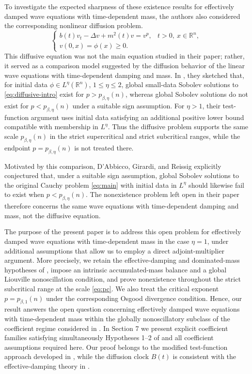 \documentclass[11pt,reqno]{amsart}
\theoremstyle{definition}
\theoremstyle{remark}
\begin{document}
	To investigate the expected sharpness of these existence results for effectively damped wave equations with time-dependent mass, the authors also considered the corresponding nonlinear diffusion problem.
	\begin{equation}
		\label{eq:diffusive-intro}
		\begin{cases}
			b(t)v_t-\Delta v+m^2(t)v=v^p,
			&t>0,\ x\in\mathbb{R}^n,\\
			v(0,x)=\phi(x)\geq0.
		\end{cases}
	\end{equation}
	This diffusive equation was not the main equation studied in their paper; rather, it served as a comparison model suggested by the diffusion behavior of the linear wave equations with time-dependent damping and mass. In \cite[Section 5]{DGR2019}, they sketched that, for initial data $\phi\in L^\eta(\mathbb R^n)$, $1\leq\eta\leq2$, global small-data Sobolev solutions to \eqref{eq:diffusive-intro} exist for $p>p_{\beta,\eta}(n)$, whereas global Sobolev solutions do not exist for $p<p_{\beta,\eta}(n)$ under a suitable sign assumption. For $\eta>1$, their test-function argument uses initial data satisfying an additional positive lower bound compatible with membership in $L^\eta$. Thus the diffusive problem supports the same scale $p_{\beta,\eta}(n)$ in the strict supercritical and strict subcritical ranges, while the endpoint $p=p_{\beta,\eta}(n)$ is not treated there.
	
	Motivated by this comparison, D'Abbicco, Girardi, and Reissig explicitly conjectured that, under a suitable sign assumption, global Sobolev solutions to the original Cauchy problem \eqref{eq:main} with initial data in $L^\eta$ should likewise fail to exist when $p<p_{\beta,\eta}(n)$. The nonexistence problem left open in their paper therefore concerns the same wave equations with time-dependent damping and mass, not the diffusive equation.
	
	The purpose of the present paper is to address this open problem for effectively damped wave equations with time-dependent mass in the case $\eta=1$, under additional assumptions that allow us to employ a direct adjoint-multiplier argument. More precisely, we retain the effective-damping and dominated-mass hypotheses of \cite{DGR2019}, impose an intrinsic accumulated-mass balance and a global Liouville nonoscillation condition, and prove nonexistence throughout the strict subcritical range at the scale \eqref{eq:pc}. We also treat the critical exponent $p=p_{\beta,1}(n)$ under the corresponding Osgood divergence condition. Hence, our result answers the open question concerning effectively damped wave equations with time-dependent mass within the globally nonoscillatory subclass of the coefficient regime considered in \cite{DGR2019}. In Section 7 we present explicit coefficient families satisfying simultaneously Hypotheses 1--2 of \cite{DGR2019} and all coefficient assumptions required here. Our proof belongs to the modified test-function approach developed in \cite{DAbbiccoLucente2013,IkedaSobajima2019,ISW2019}, while the diffusion clock $B(t)$ is consistent with the effective-damping theory in \cite{Wirth2007}.
	
\end{document}
